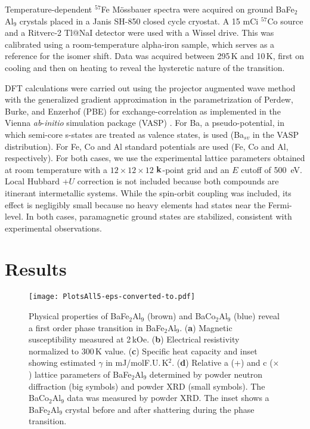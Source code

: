 \documentclass[journal=cmatex,manuscript=article]{achemso}
\begin{document}
Temperature-dependent $^{57}$Fe M\"ossbauer spectra were acquired on ground BaFe$_2$Al$_9$ crystals placed in a Janis SH-850 closed cycle cryostat. A 15 mCi $^{57}$Co source and a Ritverc-2 Tl@NaI detector were used with a Wissel drive. This was calibrated using a room-temperature alpha-iron sample, which serves as a reference for the isomer shift. Data was acquired between 295\,K and 10\,K, first on cooling and then on heating to reveal the hysteretic nature of the transition.

DFT calculations were carried out using the projector augmented wave method \cite{Kresse1999_ProjectorAugmentedWaveMethod} with the generalized gradient approximation in the parametrization of Perdew, Burke, and Enzerhof (PBE) \cite{Perdew1996_GGA} for exchange-correlation as implemented in the Vienna {\it ab}-\textit{initio} simulation package (VASP) \cite{Kresse1996_AbInitioEnergyCalculations}. For Ba, a pseudo-potential, in which semi-core s-states are treated as valence states, is used (Ba$_{sv}$ in the VASP distribution). For Fe, Co and Al standard potentials are used (Fe, Co and Al, respectively). For both cases, we use the experimental lattice parameters obtained at room temperature with a $12 \times 12 \times 12$ $\bf k$-point grid and an $E$ cutoff of 500~eV. Local Hubbard +$U$ correction is not included because both compounds are itinerant intermetallic systems. While the spin-orbit coupling was included, its effect is negligibly small because no heavy elements had states near the Fermi-level. In both cases, paramagnetic ground states are stabilized, consistent with experimental observations. 

\section{Results}
\label{sec:Results}

\begin{figure}
	\texttt{[image: PlotsAll5-eps-converted-to.pdf]}
	\caption{\label{fig:PhysicalProperties} 
		Physical properties of BaFe$_2$Al$_9$ (brown) and BaCo$_2$Al$_9$ (blue) reveal a first order phase transition in BaFe$_2$Al$_9$. (\textbf{a}) Magnetic susceptibility measured at 2\,kOe. (\textbf{b}) Electrical resistivity normalized to 300\,K value. (\textbf{c}) Specific heat capacity and inset showing estimated $\gamma$ in mJ/molF.U.\,K$^2$. (\textbf{d}) Relative a (+) and c ($\times$) lattice parameters of BaFe$_2$Al$_9$ determined by powder neutron diffraction (big symbols) and powder XRD (small symbols). The BaCo$_2$Al$_9$ data was measured by powder XRD. The inset shows a BaFe$_2$Al$_9$ crystal before and after shattering during the phase transition.
	}
\end{figure}
\end{document}
